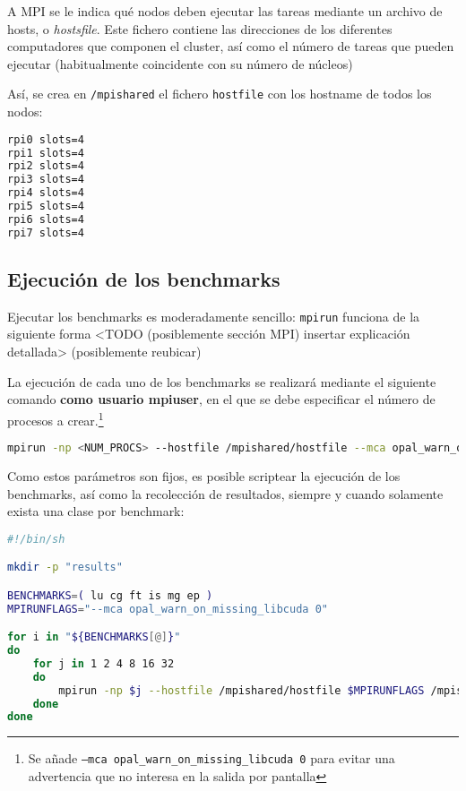 A MPI se le indica qué nodos deben ejecutar las tareas mediante un archivo de hosts, o \textit{hostsfile}\cite{mpi_hostfile_option}. Este fichero contiene las direcciones de los diferentes computadores que componen el cluster, así como el número de tareas que pueden ejecutar (habitualmente coincidente con su número de núcleos)

Así, se crea en \texttt{/mpishared} el fichero \texttt{hostfile} con los hostname de todos los nodos:

\begin{lstlisting}[language=bash]
rpi0 slots=4
rpi1 slots=4
rpi2 slots=4
rpi3 slots=4
rpi4 slots=4
rpi5 slots=4
rpi6 slots=4
rpi7 slots=4
\end{lstlisting}

\subsection{Ejecución de los benchmarks}
Ejecutar los benchmarks es moderadamente sencillo: \texttt{mpirun} funciona de la siguiente forma <TODO (posiblemente sección MPI) insertar explicación detallada> (posiblemente reubicar)

La ejecución de cada uno de los benchmarks se realizará mediante el siguiente comando \textbf{como usuario mpiuser}, en el que se debe especificar el número de procesos a crear.\footnote{Se añade \texttt{--mca opal\_warn\_on\_missing\_libcuda 0} para evitar una advertencia que no interesa en la salida por pantalla}

\begin{lstlisting}[language=bash]
mpirun -np <NUM_PROCS> --hostfile /mpishared/hostfile --mca opal_warn_on_missing_libcuda 0 /mpishared/NPB3.4.2/NPB3.4-MPI/bin/<KERNEL>.<CLASS>.x
\end{lstlisting}

Como estos parámetros son fijos, es posible scriptear la ejecución de los benchmarks, así como la recolección de resultados, siempre y cuando solamente exista una clase por benchmark:

\begin{lstlisting}[language=bash]
#!/bin/sh

mkdir -p "results"

BENCHMARKS=( lu cg ft is mg ep )
MPIRUNFLAGS="--mca opal_warn_on_missing_libcuda 0"

for i in "${BENCHMARKS[@]}"
do
    for j in 1 2 4 8 16 32
    do
        mpirun -np $j --hostfile /mpishared/hostfile $MPIRUNFLAGS /mpishared/NPB3.4.2/NPB3.4-MPI/bin/${i}.*.x | tee -a results/$i.$j.run
    done
done
\end{lstlisting}

